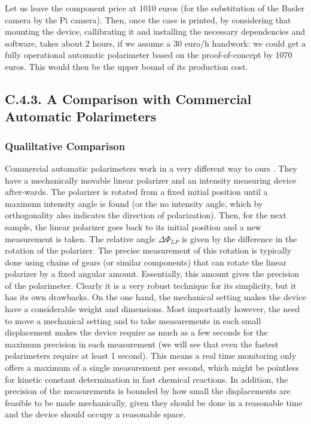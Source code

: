 \documentclass[11pt, a4paper, twoside]{article} %
\begin{document}
Let us leave the component price at 1010 euros (for the substitution of the Basler camera by the Pi camera). Then, once the case is printed, by considering that mounting the device, callibrating it and installing the necessary dependencies and software, takes about 2 hours, if we assume a 30 euro/h handwork: we could get a fully operational automatic polarimeter based on the proof-of-concept by 1070 euros. This would then be the upper bound of its production cost.\vspace{-0.4cm}
\subsection*{C.4.3. A Comparison with Commercial Automatic Polarimeters \vspace{-0.2cm}}

\subsubsection*{Qualiltative Comparison \vspace{-0.2cm}}
Commercial automatic polarimeters work in a very different way to ours \cite{polarimeters}. They have a mechanically movable linear polarizer and an intensity measuring device after-wards. The polarizer is rotated from a fixed initial position until a maximum intensity angle is found (or the no intensity angle, which by orthogonality also indicates the direction of polarization). Then, for the next sample, the linear polarizer goes back to its initial position and a new measurement is taken. The relative angle $\Delta \Phi_{LP}$ is given by the difference in the rotation of the polarizer. The precise measurement of this rotation is typically done using chains of gears (or similar components) that can rotate the linear polarizer by a fixed angular amount. Essentially, this amount gives the precision of the polarimeter. Clearly it is a very robust technique for its simplicity, but it has its own drawbacks. On the one hand, the mechanical setting makes the device have a considerable weight and dimensions. Most importantly however, the need to move a mechanical setting and to take measurements in each small displacement makes the device require as much as a few seconds for the maximum precision in each measurement (we will see that even the fastest polarimeters require at least 1 second). This means a real time monitoring only offers a maximum of a single measurement per second, which might be pointless for kinetic constant determination in fast chemical reactions. In addition, the precision of the measurements is bounded by how small the displacements are feasible to be made mechanically, given they should be done in a reasonable time and the device should occupy a reasonable space. 
\end{document}
